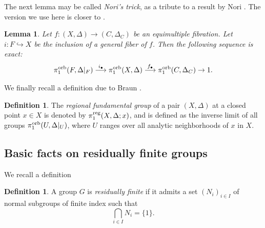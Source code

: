 \documentclass{amsart}
\newtheorem{lemma}[theorem]{Lemma}
\theoremstyle{definition}
\newtheorem{definition}[theorem]{Definition}
\newtheorem{remark}[theorem]{Remark}
\theoremstyle{remark}
\numberwithin{equation}{section}
\begin{document}

The next lemma may be called {\it Nori's trick}, as a tribute to a result by Nori \cite[Lemma 1.5.C]{Nor83}. The version we use here is closer to \cite[Lemma 3.13]{FM23}.

\begin{lemma}\label{lem:nori}
Let $f:(X,\Delta)\to (C,\Delta_C)$ be an equimultiple fibration. Let $i:F\hookrightarrow X$ be the inclusion of a general fiber of $f$. Then the following sequence is exact:
$$\pi_1^{\rm orb}(F,\Delta|_F)\overset{i_{\bullet}}{\longrightarrow} \pi_1^{\rm orb}(X,\Delta)\overset{f_{\bullet}}{\longrightarrow} \pi_1^{\rm orb}(C,\Delta_C)\to 1.$$
\end{lemma}


We finally recall a definition due to Braun \cite{Bra20}.

\begin{definition}
The {\em regional fundamental group} 
of a pair $(X,\Delta)$ at a closed point $x\in X$ is
denoted by $\pi_1^{\rm reg}(X,\Delta;x)$, and is defined as the inverse limit of all groups $\pi_1^{\rm orb}(U,\Delta|_U)$, where $U$ ranges over all analytic neighborhoods of $x$ in $X$.
\end{definition}

\subsection{Basic facts on residually finite groups}\label{subsec-rf} 
We recall a definition

\begin{definition}
A group $G$ is {\it residually finite} if it admits a set $(N_i)_{i\in I}$ of normal subgroups of finite index such that $$\bigcap_{i\in I} N_i=\{1\}.$$
\end{definition}
\end{document}
